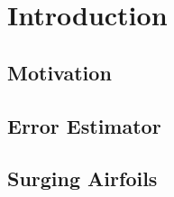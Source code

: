  
\chapter{Introduction}

\section{Motivation}

\label{sec:motivation}


\section{Error Estimator}

\label{sec:intro_ee}

\section{Surging Airfoils}

\label{sec:surging}




